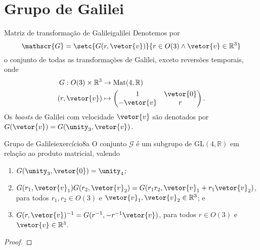\section{Grupo de Galilei}
\begin{definition}{Matriz de transformação de Galilei}{galilei}
    Denotemos por
    \begin{equation*}
        \mathscr{G} = \setc{G(r, \vetor{v})}{r \in O(3) \land \vetor{v} \in \mathbb{R}^3}
    \end{equation*}
    o conjunto de todas as transformações de Galilei, exceto reversões temporais, onde
    \begin{align*}
        G : O(3) \times \mathbb{R}^3 &\to \mathrm{Mat}(4, \mathbb{R})\\
                       (r,\vetor{v}) &\mapsto \begin{pmatrix}
                           1 & \vetor{0}\\
                           -\vetor{v} & r
                       \end{pmatrix}.
    \end{align*}
    Os \emph{boosts} de Galilei com velocidade \(\vetor{v}\) são denotados por \(G(\vetor{v}) = G(\unity_3, \vetor{v})\).
\end{definition}

\begin{proposition}{Grupo de Galilei}{exercício8a}
    O conjunto \(\mathscr{G}\) é um subgrupo de \(\mathrm{GL}(4,\mathbb{\mathbb{R}})\) em relação ao produto matricial, valendo
    \begin{enumerate}[label=(\roman*)]
        \item \(G(\unity_3, \vetor{0}) = \unity_4\);
        \item \(G(r_1, \vetor{v}_1) G(r_2, \vetor{v}_2) = G(r_1r_2, \vetor{v}_1 + r_1\vetor{v}_2)\), para todos \(r_1,r_2 \in O(3)\) e \(\vetor{v}_1, \vetor{v}_2 \in \mathbb{R}^3\); e
        \item \(G(r, \vetor{v})^{-1} = G(r^{-1}, -r^{-1}\vetor{v})\), para todos \(r \in O(3)\) e \(\vetor{v} \in \mathbb{R}^3\).
    \end{enumerate}
\end{proposition}
\begin{proof}

\end{proof}

